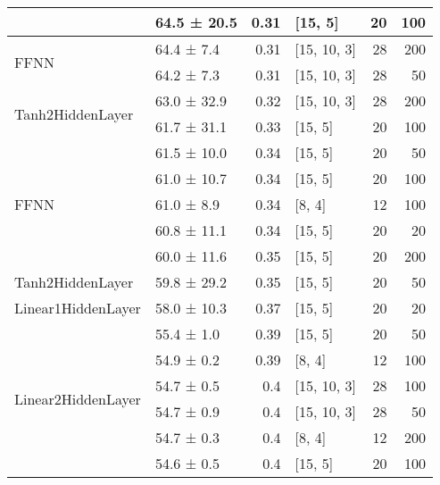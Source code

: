 \begin{table*}[h]
\begin{tabular}{llrlrr}
                                            & 64.5 ± 20.5 &  0.31 & [15, 5]        &         20 &      100 \\
 \hline
\multirow{2}{*}{FFNN}               & 64.4 ± 7.4  &  0.31 & [15, 10, 3]    &         28 &      200 \\
                                            & 64.2 ± 7.3  &  0.31 & [15, 10, 3]    &         28 &       50 \\
 \hline
\multirow{2}{*}{Tanh2HiddenLayer}   & 63.0 ± 32.9 &  0.32 & [15, 10, 3]    &         28 &      200 \\
                                            & 61.7 ± 31.1 &  0.33 & [15, 5]        &         20 &      100 \\
 \hline
\multirow{5}{*}{FFNN}               & 61.5 ± 10.0 &  0.34 & [15, 5]        &         20 &       50 \\
                                            & 61.0 ± 10.7 &  0.34 & [15, 5]        &         20 &      100 \\
                                            & 61.0 ± 8.9  &  0.34 & [8, 4]         &         12 &      100 \\
                                            & 60.8 ± 11.1 &  0.34 & [15, 5]        &         20 &       20 \\
                                            & 60.0 ± 11.6 &  0.35 & [15, 5]        &         20 &      200 \\
 \hline
Tanh2HiddenLayer                    & 59.8 ± 29.2 &  0.35 & [15, 5]        &         20 &       50 \\
 \hline
Linear1HiddenLayer                  & 58.0 ± 10.3 &  0.37 & [15, 5]        &         20 &       20 \\
 \hline
\multirow{6}{*}{Linear2HiddenLayer} & 55.4 ± 1.0  &  0.39 & [15, 5]        &         20 &       50 \\
                                            & 54.9 ± 0.2  &  0.39 & [8, 4]         &         12 &      100 \\
                                            & 54.7 ± 0.5  &  0.4  & [15, 10, 3]    &         28 &      100 \\
                                            & 54.7 ± 0.9  &  0.4  & [15, 10, 3]    &         28 &       50 \\
                                            & 54.7 ± 0.3  &  0.4  & [8, 4]         &         12 &      200 \\
                                            & 54.6 ± 0.5  &  0.4  & [15, 5]        &         20 &      100 \\

\end{tabular}
\end{table*}
